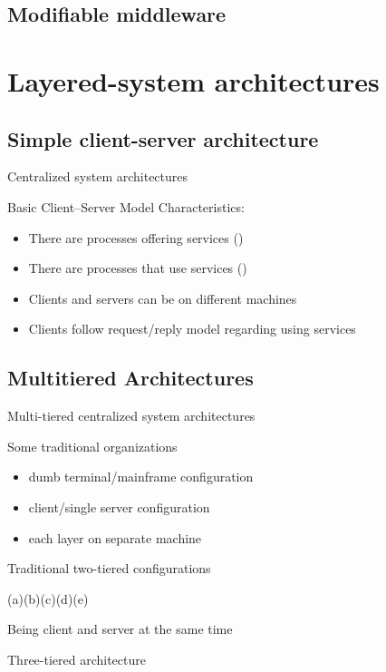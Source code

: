 \subsection{Modifiable middleware}
\section{Layered-system architectures}
\subsection{Simple client-server architecture}
\begin{slide}{Centralized system architectures}
  \begin{block}{Basic Client--Server Model}
    Characteristics:
    \begin{itemize}\tightlist
    \item There are processes offering services () 
    \item There are processes that use services ()
    \item Clients and servers can be on different machines
    \item Clients follow request/reply model regarding using services
    \end{itemize}
    \begin{center}
    \end{center}
  \end{block}
\end{slide}
\subsection{Multitiered Architectures}
\begin{slide}{Multi-tiered centralized system architectures}
  \begin{block}{Some traditional organizations}
    \begin{itemize}\tightlist
    \item {} dumb terminal/mainframe configuration
    \item {} client/single server configuration
    \item {} each layer on separate machine
    \end{itemize}
  \end{block}
  \begin{block}{Traditional two-tiered configurations}
    \newcommand{\ispace}{\hspace*{1.8cm}}
    \begin{center}
       \newline
      (a)\ispace(b)\ispace(c)\ispace(d)\ispace(e)
    \end{center}
  \end{block}
\end{slide}
\begin{slide}{Being client and server at the same time}
  \begin{block}{Three-tiered architecture}
    \vspace*{12pt}
    \centering{}
  \end{block}
\end{slide}
